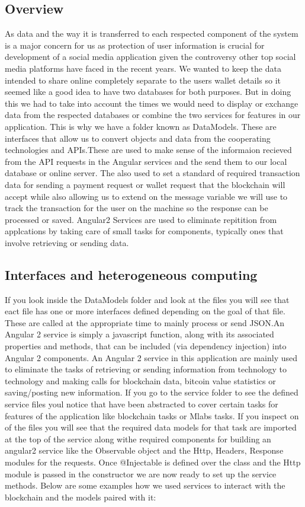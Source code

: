\subsection{Overview}
As data and the way it is transferred to each respected component of the system is a major concern for us as protection of user information is crucial for development of a social media application given the controversy other top social media platforms have faced in the recent years. We wanted to keep the data intended to share online completely separate to the users wallet details so it seemed like a good idea to have two databases for both purposes. But in doing this we had to take into account the times we would need to display or exchange data from the respected databases or combine the two services for features in our application. This is why we have a folder known as DataModels. These are interfaces that allow us to convert objects and data from the cooperating technologies and APIs.These are used to make sense of the informaion recieved from the API requests in the Angular services and the send them to our local database or online server. The also used to set a standard of required transaction data for sending a payment request or wallet request that the blockchain will accept while also allowing us to extend on the message variable we will use to track the transaction for the user on the machine so the response can be processed or saved. Angular2 Services are used to eliminate repitition from applcations by taking care of small tasks for components, typically ones that involve retrieving or sending data.

\subsection{Interfaces and heterogeneous computing}
If you look inside the DataModels folder and look at the files you will see that eact file has one or more interfaces defined depending on the goal of that file. These are called at the appropriate time to mainly process or send JSON.An Angular 2 service is simply a javascript function, along with its associated properties and methods, that can be included (via dependency injection) into Angular 2 components. An Angular 2 service in this application are mainly used to eliminate the tasks of retrieving or sending information from technology to technology and making calls for blockchain data, bitcoin value statistics or saving/posting new information. If you go to the service folder to see the defined service files youl notice that have been abstracted to cover certain tasks for features of the application like blockchain tasks or Mlabs tasks. If you inspect on of the files you will see that the required data models for that task are imported at the top of the service along withe required components for building an angular2 service like the Observable object and the Http, Headers, Response modules for the requests. Once @Injectable is defined over the class and the Http module is passed in the constructor we are now ready to set up the service methods. Below are some examples how we used services to interact with the blockchain and the models paired with it:

